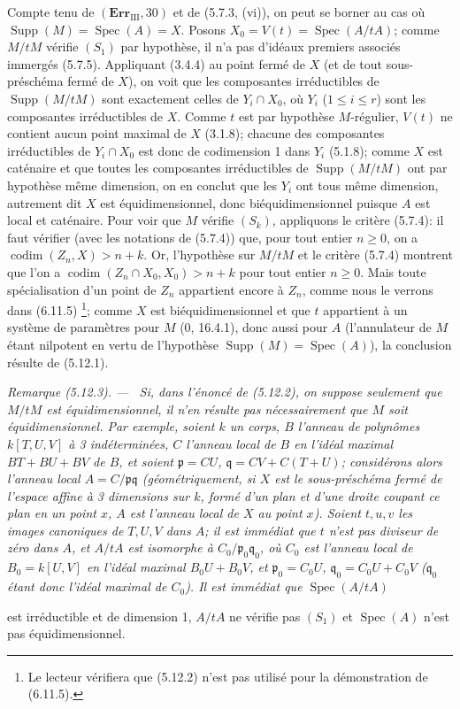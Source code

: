 \documentclass[10pt,oneside]{book}
\newcommand{\oldpage}[2][]{%
  \setcounter{footnote}{0}%
  \marginpar{\scriptsize\textbf{#1}~|~#2}\ignorespaces}
\newenvironment{remark}[1][]{%
  \par\medskip\noindent\itshape Remarque (#1). ---\ }{\par}
\begin{document}
Compte tenu de $(\mathbf{Err}_{\mathrm{III}},30)$ et de (5.7.3, (vi)), on peut
se borner au cas où $\operatorname{Supp}(M)=\operatorname{Spec}(A)=X$. Posons
$X_0=V(t)=\operatorname{Spec}(A/tA)$; comme $M/tM$ vérifie $(S_1)$ par
hypothèse, il n'a pas d'idéaux premiers associés immergés (5.7.5). Appliquant
(3.4.4) au point fermé de $X$ (et de tout sous-préschéma fermé de $X$), on
voit que les composantes irréductibles de $\operatorname{Supp}(M/tM)$ sont
exactement celles de $Y_i\cap X_0$, où $Y_i$ ($1\leq i\leq r$) sont les
composantes irréductibles de $X$. Comme $t$ est par hypothèse $M$-régulier,
$V(t)$ ne contient aucun point maximal de $X$ (3.1.8); chacune des composantes
irréductibles de $Y_i\cap X_0$ est donc de codimension 1 dans $Y_i$ (5.1.8);
comme $X$ est caténaire et que toutes les composantes irréductibles de
$\operatorname{Supp}(M/tM)$ ont par hypothèse même dimension, on en conclut
que les $Y_i$ ont tous même dimension, autrement dit $X$ est équidimensionnel,
donc biéquidimensionnel puisque $A$ est local et caténaire. Pour voir que $M$
vérifie $(S_k)$, appliquons le critère (5.7.4): il faut vérifier (avec les
notations de (5.7.4)) que, pour tout entier $n\geq0$, on a
$\operatorname{codim}(Z_n,X)>n+k$. Or, l'hypothèse sur $M/tM$ et le critère
(5.7.4) montrent que l'on a
$\operatorname{codim}(Z_n\cap X_0,X_0)>n+k$ pour tout entier $n\geq0$. Mais
toute spécialisation d'un point de $Z_n$ appartient encore à $Z_n$, comme nous
le verrons dans (6.11.5)
\footnote{Le lecteur vérifiera que (5.12.2) n'est pas utilisé pour la
démonstration de (6.11.5).}; comme $X$ est biéquidimensionnel et que $t$
appartient à un système de paramètres pour $M$ (0, 16.4.1), donc aussi pour
$A$ (l'annulateur de $M$ étant nilpotent en vertu de l'hypothèse
$\operatorname{Supp}(M)=\operatorname{Spec}(A)$), la conclusion résulte de
(5.12.1).

\begin{remark}[5.12.3]
\label{IV.2.s5.12.3-fr}
Si, dans l'énoncé de (5.12.2), on suppose seulement que $M/tM$ est
équidimensionnel, il n'en résulte pas nécessairement que $M$ soit
équidimensionnel. Par exemple, soient $k$ un corps, $B$ l'anneau de polynômes
$k[T,U,V]$ à 3 indéterminées, $C$ l'anneau local de $B$ en l'idéal maximal
$BT+BU+BV$ de $B$, et soient $\mathfrak p=CU$,
$\mathfrak q=CV+C(T+U)$; considérons alors l'anneau local
$A=C/\mathfrak p\mathfrak q$ (géométriquement, si $X$ est le sous-préschéma
fermé de l'espace affine à 3 dimensions sur $k$, formé d'un plan et d'une
droite coupant ce plan en un point $x$, $A$ est l'anneau local de $X$ au point
$x$). Soient $t,u,v$ les images canoniques de $T,U,V$ dans $A$; il est
immédiat que $t$ n'est pas diviseur de zéro dans $A$, et $A/tA$ est isomorphe
à $C_0/\mathfrak p_0\mathfrak q_0$, où $C_0$ est l'anneau local de
$B_0=k[U,V]$ en l'idéal maximal $B_0U+B_0V$, et
$\mathfrak p_0=C_0U$, $\mathfrak q_0=C_0U+C_0V$ ($\mathfrak q_0$ étant donc
l'idéal maximal de $C_0$). Il est immédiat que $\operatorname{Spec}(A/tA)$

\oldpage[IV-2]{128}

est irréductible et de dimension 1, $A/tA$ ne vérifie pas $(S_1)$ et
$\operatorname{Spec}(A)$ n'est pas équidimensionnel.
\end{remark}
\end{document}
